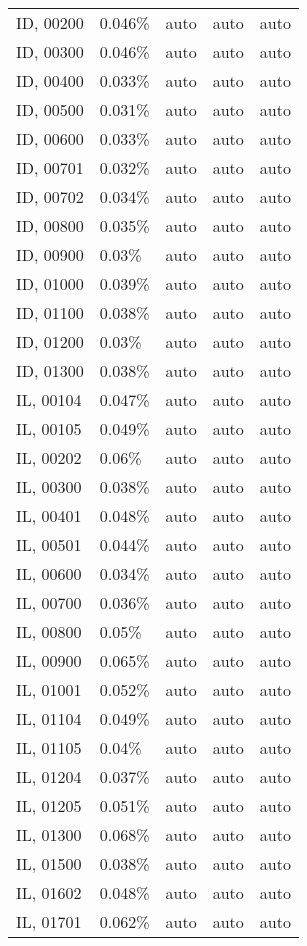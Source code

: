 \begin{longtable}[]{@{}lllll@{}}
ID, 00200 & 0.046\% & auto & auto & auto \\
ID, 00300 & 0.046\% & auto & auto & auto \\
ID, 00400 & 0.033\% & auto & auto & auto \\
ID, 00500 & 0.031\% & auto & auto & auto \\
ID, 00600 & 0.033\% & auto & auto & auto \\
ID, 00701 & 0.032\% & auto & auto & auto \\
ID, 00702 & 0.034\% & auto & auto & auto \\
ID, 00800 & 0.035\% & auto & auto & auto \\
ID, 00900 & 0.03\% & auto & auto & auto \\
ID, 01000 & 0.039\% & auto & auto & auto \\
ID, 01100 & 0.038\% & auto & auto & auto \\
ID, 01200 & 0.03\% & auto & auto & auto \\
ID, 01300 & 0.038\% & auto & auto & auto \\
IL, 00104 & 0.047\% & auto & auto & auto \\
IL, 00105 & 0.049\% & auto & auto & auto \\
IL, 00202 & 0.06\% & auto & auto & auto \\
IL, 00300 & 0.038\% & auto & auto & auto \\
IL, 00401 & 0.048\% & auto & auto & auto \\
IL, 00501 & 0.044\% & auto & auto & auto \\
IL, 00600 & 0.034\% & auto & auto & auto \\
IL, 00700 & 0.036\% & auto & auto & auto \\
IL, 00800 & 0.05\% & auto & auto & auto \\
IL, 00900 & 0.065\% & auto & auto & auto \\
IL, 01001 & 0.052\% & auto & auto & auto \\
IL, 01104 & 0.049\% & auto & auto & auto \\
IL, 01105 & 0.04\% & auto & auto & auto \\
IL, 01204 & 0.037\% & auto & auto & auto \\
IL, 01205 & 0.051\% & auto & auto & auto \\
IL, 01300 & 0.068\% & auto & auto & auto \\
IL, 01500 & 0.038\% & auto & auto & auto \\
IL, 01602 & 0.048\% & auto & auto & auto \\
IL, 01701 & 0.062\% & auto & auto & auto \\

\end{longtable}
